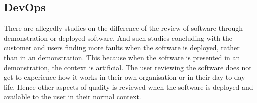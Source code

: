 





\subsection{DevOps}
There are allegedly studies on the difference of the review of software through demonstration or deployed software. And such studies concluding with the customer and users finding more faults when the software is deployed, rather than in an demonstration. This because when the software is presented in an demonstration, the context is artificial. The user reviewing the software does not get to experience how it works in their own organisation or in their day to day life. Hence other aspects of quality is reviewed when the software is deployed and available to the user in their normal context.

